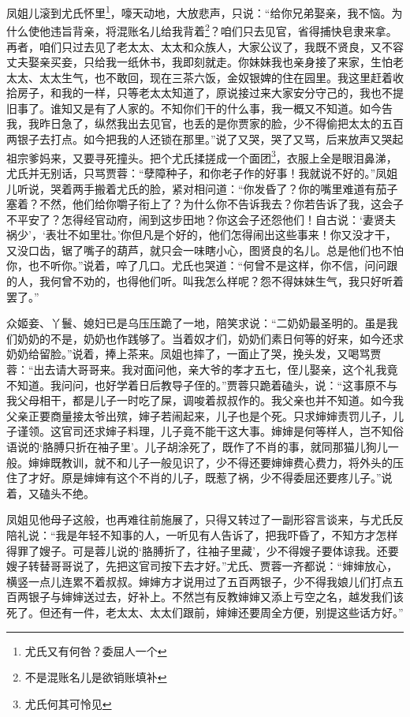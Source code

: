 \documentclass[12pt,oneside]{book}
\begin{document}
凤姐儿滚到尤氏怀里\footnote{尤氏又有何咎？委屈人一个}，嚎天动地，大放悲声，只说：“给你兄弟娶亲，我不恼。为什么使他违旨背亲，将混账名儿给我背着\footnote{不是混账名儿是欲销账填补}？咱们只去见官，省得捕快皂隶来拿。再者，咱们只过去见了老太太、太太和众族人，大家公议了，我既不贤良，又不容丈夫娶亲买妾，只给我一纸休书，我即刻就走。你妹妹我也亲身接了来家，生怕老太太、太太生气，也不敢回，现在三茶六饭，金奴银婢的住在园里。我这里赶着收拾房子，和我的一样，只等老太太知道了，原说接过来大家安分守己的，我也不提旧事了。谁知又是有了人家的。不知你们干的什么事，我一概又不知道。如今告我，我昨日急了，纵然我出去见官，也丢的是你贾家的脸，少不得偷把太太的五百两银子去打点。如今把我的人还锁在那里。”说了又哭，哭了又骂，后来放声又哭起祖宗爹妈来，又要寻死撞头。把个尤氏揉搓成一个面团\footnote{尤氏何其可怜见}，衣服上全是眼泪鼻涕，尤氏并无别话，只骂贾蓉：“孽障种子，和你老子作的好事！我就说不好的。”凤姐儿听说，哭着两手搬着尤氏的脸，紧对相问道：“你发昏了？你的嘴里难道有茄子塞着？不然，他们给你嚼子衔上了？为什么你不告诉我去？你若告诉了我，这会子不平安了？怎得经官动府，闹到这步田地？你这会子还怨他们！自古说：‘妻贤夫祸少’，‘表壮不如里壮。’你但凡是个好的，他们怎得闹出这些事来！你又没才干，又没口齿，锯了嘴子的葫芦，就只会一味瞎小心，图贤良的名儿。总是他们也不怕你，也不听你。”说着，啐了几口。尤氏也哭道：“何曾不是这样，你不信，问问跟的人，我何曾不劝的，也得他们听。叫我怎么样呢？怨不得妹妹生气，我只好听着罢了。”

众姬妾、丫鬟、媳妇已是乌压压跪了一地，陪笑求说：“二奶奶最圣明的。虽是我们奶奶的不是，奶奶也作践够了。当着奴才们，奶奶们素日何等的好来，如今还求奶奶给留脸。”说着，捧上茶来。凤姐也摔了，一面止了哭，挽头发，又喝骂贾蓉：“出去请大哥哥来。我对面问他，亲大爷的孝才五七，侄儿娶亲，这个礼我竟不知道。我问问，也好学着日后教导子侄的。”贾蓉只跪着磕头，说：“这事原不与我父母相干，都是儿子一时吃了屎，调唆着叔叔作的。我父亲也并不知道。如今我父亲正要商量接太爷出殡，婶子若闹起来，儿子也是个死。只求婶婶责罚儿子，儿子谨领。这官司还求婶子料理，儿子竟不能干这大事。婶婶是何等样人，岂不知俗语说的‘胳膊只折在袖子里’。儿子胡涂死了，既作了不肖的事，就同那猫儿狗儿一般。婶婶既教训，就不和儿子一般见识了，少不得还要婶婶费心费力，将外头的压住了才好。原是婶婶有这个不肖的儿子，既惹了祸，少不得委屈还要疼儿子。”说着，又磕头不绝。

凤姐见他母子这般，也再难往前施展了，只得又转过了一副形容言谈来，与尤氏反陪礼说：“我是年轻不知事的人，一听见有人告诉了，把我吓昏了，不知方才怎样得罪了嫂子。可是蓉儿说的‘胳膊折了，往袖子里藏’，少不得嫂子要体谅我。还要嫂子转替哥哥说了，先把这官司按下去才好。”尤氏、贾蓉一齐都说：“婶婶放心，横竖一点儿连累不着叔叔。婶婶方才说用过了五百两银子，少不得我娘儿们打点五百两银子与婶婶送过去，好补上。不然岂有反教婶婶又添上亏空之名，越发我们该死了。但还有一件，老太太、太太们跟前，婶婶还要周全方便，别提这些话方好。”
\end{document}
